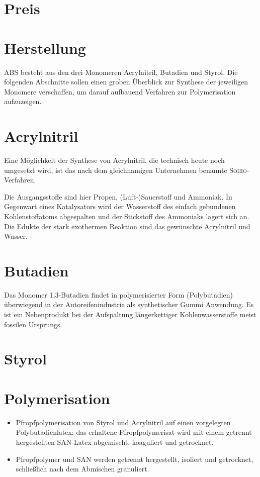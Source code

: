\section{Preis}
\section{Herstellung}
    ABS besteht aus den drei Monomeren Acrylnitril, Butadien und Styrol. Die folgenden Abschnitte sollen einen groben
    Überblick zur Synthese der jeweiligen Monomere verschaffen, um darauf aufbauend Verfahren zur Polymerisation aufzuzeigen.
    \section{Acrylnitril}
        Eine Möglichkeit der Synthese von Acrylnitril, die technisch heute noch umgesetzt wird, ist das nach dem gleichnamigen
        Unternehmen benannte \textsc{Sohio}-Verfahren.\par
        Die Ausgangsstoffe sind hier Propen, (Luft-)Sauerstoff und Ammoniak. In Gegenwart eines Katalysators wird der Wasserstoff
        des einfach gebundenen Kohlenstoffatoms abgespalten und der Stickstoff des Ammoniaks lagert sich an. Die Edukte der
        stark exothermen Reaktion sind das gewünschte Acrylnitril und Wasser.\cite{sohio-verfahren.acrylnitril.synthese.Wikipedia.2020b}
    \section{Butadien}
        Das Monomer 1,3-Butadien findet in polymerisierter Form (Polybutadien) überwiegend in der Autoreifenindustrie als synthetischer Gummi
        Anwendung. Es ist ein Nebenprodukt bei der Aufspaltung längerkettiger Kohlenwasserstoffe meist fossilen Ursprungs.
    \section{Styrol}

    \section{Polymerisation}
        \begin{itemize}
            \item Pfropfpolymerisation von Styrol und Acrylnitril auf einen vorgelegten Polybutadienlatex; das erhaltene Pfropfpolymerisat
            wird mit einem getrennt hergestellten SAN-Latex abgemischt, koaguliert und getrocknet. \cite{Domininghaus.1998.Kunststoffe.und.ihre.Eigenschaften,Eyerer.2020.Polymer.Engineering.1}
            \item Pfropfpolymer und SAN werden getrennt hergestellt, isoliert und getrocknet, schließlich nach dem Abmischen granuliert. \cite{Domininghaus.1998.Kunststoffe.und.ihre.Eigenschaften,Eyerer.2020.Polymer.Engineering.1}
        \end{itemize}
